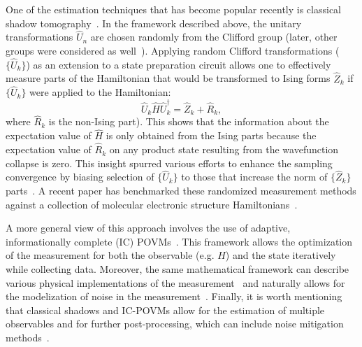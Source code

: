 One of the estimation techniques that has become popular recently is classical shadow tomography~\cite{Preskill:ShadowTom}.
In the framework described above, the unitary transformations $\hat U_n$ are chosen randomly from the Clifford group (later, other groups were considered as well~\cite{RubinMiyake,ogorman2022fermionic}).
Applying random Clifford transformations ($\{\hat U_k\}$) as an extension to a state preparation circuit allows one to effectively measure parts of the Hamiltonian that would be transformed to Ising forms $\hat Z_k$ if $\{\hat U_k\}$ were applied to the Hamiltonian:
\begin{equation}
    \hat U_k \hat H \hat U_k^\dagger = \hat Z_k + \hat R_k,
\end{equation}
where $\hat R_k$ is the non-Ising part).
This shows that the information about the expectation value of $\hat H$ is only obtained from the Ising parts because the expectation value of $\hat R_k$ on any product state resulting from the wavefunction collapse is zero.
This insight spurred various efforts to enhance the sampling convergence by biasing selection of $\{\hat U_k\}$ to those that increase the norm of $\{\hat Z_k\}$ parts~\cite{huang2020predicting,Huang_Preskill:2021,Hadfield_Mezzacapo:2022,Hadfield:2021,lukens2021bayesian,shlosberg2023adaptiveestimation,koh2022classical,elben2023randomized,hillmich2021decision}.
A recent paper has benchmarked these randomized measurement methods against a collection of molecular electronic structure Hamiltonians~\cite{dutt2023practical}.

A more general view of this approach involves the use of adaptive, informationally complete (IC) POVMs~\cite{garciaperez2021learning,acharya2021informationally}. This framework allows the optimization of the measurement for both the observable (e.g. $H$) and the state iteratively while collecting data. Moreover, the same mathematical framework can describe various physical implementations of the measurement~\cite{fischer2022ancillafree} and naturally allows for the modelization of noise in the measurement~\cite{glos2022adaptive}. Finally, it is worth mentioning that classical shadows and IC-POVMs allow for the estimation of multiple observables and for further post-processing, which can include noise mitigation methods~\cite{filippov2023scalable}.


